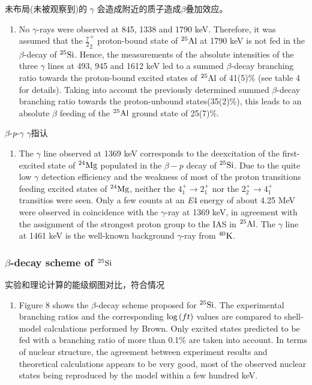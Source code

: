 \documentclass[UTF8]{ctexart}
\begin{document}
未布局(未被观察到)的 $\gamma$ 会造成附近的质子造成$\beta$叠加效应。
\begin{enumerate}
    \item No $\gamma$-rays were observed at 845, 1338 and 1790 keV. Therefore, it was assumed that the $\frac{7}{2}_{2}^{+}$ proton-bound state of $^{25}\textnormal{Al}$ at 1790 keV is not fed in the $\beta$-decay of $^{25}\textnormal{Si}$. Hence, the measurements of the absolute intensities of the three $\gamma$ lines at 493, 945 and 1612 keV led to a summed $\beta$-decay branching ratio towards the proton-bound excited states of $^{25}\textnormal{Al}$ of 41(5)\% (see table 4 for details). Taking into account the previously determined summed $\beta$-decay branching ratio towards the proton-unbound states(35(2)\%), this leads to an absolute $\beta$ feeding of the $^{25}\textnormal{Al}$ ground state of 25(7)\%.
\end{enumerate}

$\beta$-\textit{p}-$\gamma$ $\gamma$指认
\begin{enumerate}
    \item The $\gamma$ line observed at 1369 keV corresponds to the deexcitation of the first-excited state of $^{24}\textnormal{Mg}$ populated in the $\beta-p$ decay of $^{25}\textnormal{Si}$. Due to the quite low $\gamma$ detection efficiency and the weakness of most of the proton transitions feeding excited states of $^{24}\textnormal{Mg}$, neither the $4_{1}^{+}\to 2_{1}^{+}$ nor the $2_{2}^{+}\to 4_{1}^{+}$ transitios were seen. Only a few counts at an \textit{E}4 energy of about 4.25 MeV were observed in coincidence with the $\gamma$-ray at 1369 keV, in agreement with the assignment of the strongest proton group to the IAS in $^{25}\textnormal{Al}$. The $\gamma$ line at 1461 keV is the well-known background $\gamma$-ray from $^{40}\textnormal{K}$.
\end{enumerate}

\subsubsection{$\beta$-decay scheme of $^{25}\textnormal{Si}$}
实验和理论计算的能级纲图对比，符合情况
\begin{enumerate}
    \item Figure 8 shows the $\beta$-decay scheme proposed for $^{25}\textnormal{Si}$. The experimental branching ratios and the corresponding $\textnormal{log}\left( ft \right)$ values are compared to shell-model calculations performed by Brown. Only excited states predicted to be fed with a branching ratio of more than 0.1\% are taken into account. In terms of nuclear structure, the agreement between experiment results and theoretical calculations appears to be very good, most of the observed nuclear states being reproduced by the model within a few hundred keV.
\end{enumerate}
\end{document}
